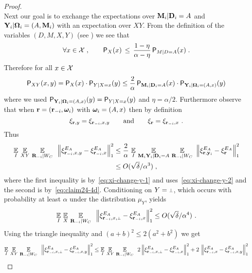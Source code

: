 \begin{proof}
\begin{equation}
\end{equation}
Next our goal is to exchange the expectations over $\mathbf{M}_i | \mathbf{D}_i = A$ and $\mathbf{Y}_i | {\boldsymbol{\Omega}}_i = (A,\mathbf{M}_i)$ with an expectation over $XY$. From the definition of the variables $(D,M,X,Y)$ (see ) we see that
\[\forall x\in \mathcal{X}\;,\qquad \mathsf{P}_X(x) \,\leq\, \frac{1 - \eta}{\alpha - \eta} \, \mathsf{P}_{M|D=A}(x)\;.\] 
Therefore for all $x \in \mathcal{X}$
\begin{equation}
\label{eq:xi-change-y-1}
	\mathsf{P}_{XY}(x,y) = \mathsf{P}_{X}(x) \cdot \mathsf{P}_{Y|X=x}(y) \leq \frac{2}{\alpha} \,\mathsf{P}_{\mathbf{M}_i | \mathbf{D}_i = A}(x) \cdot \mathsf{P}_{\mathbf{Y}_i | {\boldsymbol{\Omega}}_i = (A,x)}(y)
\end{equation}
where we used $\mathsf{P}_{\mathbf{Y}_i | {\boldsymbol{\Omega}}_i = (A,x)}(y) = \mathsf{P}_{Y|X=x}(y)$ and $\eta = \alpha/2$. Furthermore observe that when $\mathbf{r} = (\mathbf{r}_{-i},{\boldsymbol{\omega}}_i)$ with ${\boldsymbol{\omega}}_i = (A,x)$ then by definition
\begin{equation}
\label{eq:xi-change-y-2}
	\xi_{\mathbf{r},y} = \xi_{\mathbf{r}_{-i},x,y} \qquad \text{and} \qquad \xi_{\mathbf{r}} = \xi_{\mathbf{r}_{-i},x}~.
\end{equation}
Thus
\begin{align}
	\operatorname*{\mathbb{E}}_I \, \operatorname*{\mathbb{E}}_{XY} \, \operatorname*{\mathbb{E}}_{\mathbf{R}_{-i} | W_C} \, \,\, \Big \| \xi^{E_A}_{\mathbf{r}_{-i},x,y} -  \xi^{E_A}_{\mathbf{r}_{-i},x} \Big \|_1^2 &\leq \frac{2}{\alpha} \, \operatorname*{\mathbb{E}}_I \, \operatorname*{\mathbb{E}}_{\mathbf{M}_i \mathbf{Y}_i | \mathbf{D}_i =A} \, \operatorname*{\mathbb{E}}_{\mathbf{R}_{-i} | W_C} \,\, \Big \| \xi^{E_A}_{\mathbf{r},\mathbf{y}_i} -  \xi^{E_A}_{\mathbf{r}} \Big \|_1^2 \notag\\
	&\leq O(\sqrt{\delta}/\alpha^3)\;,\label{eq:xi-change-y-3}
\end{align}
where the first inequality is by~\eqref{eq:xi-change-y-1} and uses~\eqref{eq:xi-change-y-2} and the second is by~\eqref{eq:claim24-4d}. 
Conditioning on $Y = \dummy$, which occurs with probability at least $\alpha$ under the distribution $\mu_Y$, yields
\begin{equation}
\label{eq:xi-change-y-4}
	\Ex_I \, \Ex_{X} \, \Ex_{\bR_\mi | W_C} \, \,\, \Big \| \xi^{E_A}_{\br_\mi,x,\dummy} -  \xi^{E_A}_{\br_\mi,x} \Big \|_1^2 \leq O(\sqrt{\delta}/\alpha^4)~.
\end{equation}
Using the triangle inequality and $(a+b)^2 \leq 2(a^2+b^2)$ we get 
\begin{align*}
\Ex_I \, \Ex_{XY} \, \Ex_{\bR_\mi | W_C} \, \,\, \Big \| \xi^{E_A}_{\br_\mi,x,\dummy} -  \xi^{E_A}_{\br_\mi,x,y} \Big \|_1^2 &\leq \Ex_I \, \Ex_{XY} \, \Ex_{\bR_\mi | W_C} \, \,\, 2 \, \Big \| \xi^{E_A}_{\br_\mi,x,\dummy} -  \xi^{E_A}_{\br_\mi,x} \Big \|_1^2 + 2 \,\, \Big \| \xi^{E_A}_{\br_\mi,x} -  \xi^{E_A}_{\br_\mi,x,y} \Big \|_1^2 \\

\end{align*}
\end{proof}
